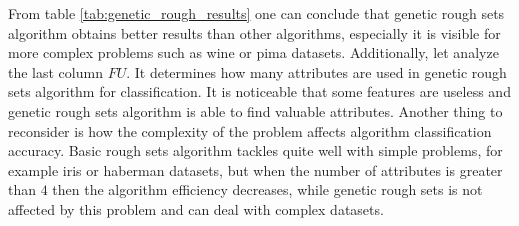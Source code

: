 From table \ref{tab:genetic_rough_results} one can conclude that genetic rough
sets algorithm obtains better results than other algorithms, especially it is
visible for more complex problems such as wine or pima datasets. Additionally,
let analyze the last column $FU$. It determines how many attributes are used in
genetic rough sets algorithm for classification. It is noticeable that some
features are useless and genetic rough sets algorithm is able to find
valuable attributes. Another thing to reconsider is how the complexity of the
problem affects algorithm classification accuracy. Basic rough sets algorithm
tackles quite well with simple problems, for example iris or haberman datasets,
but when the number of attributes is greater than $4$ then the algorithm efficiency
decreases, while genetic rough sets is not affected by this problem and can
deal with complex datasets.


